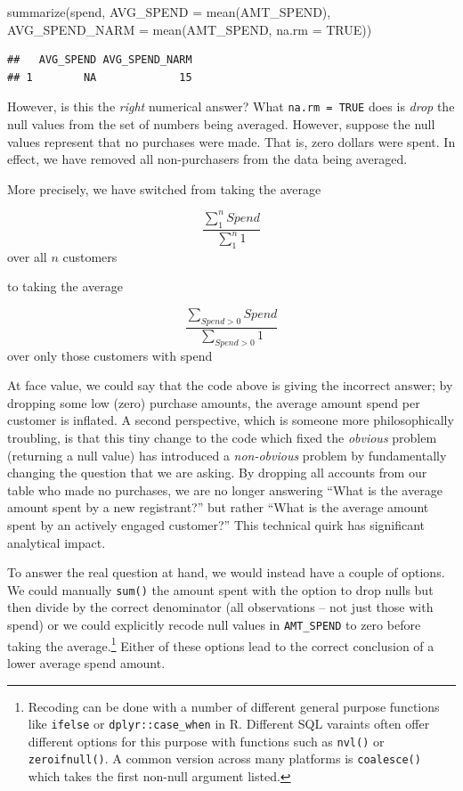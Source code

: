 \documentclass[
]{krantz}
\makeatletter
\newenvironment{Shaded}{\begin{snugshade}}{\end{snugshade}}
\newcommand{\AttributeTok}[1]{\textcolor[rgb]{0.61,0.61,0.61}{#1}}
\newcommand{\ConstantTok}[1]{\textcolor[rgb]{0,0,0}{#1}}
\newcommand{\FunctionTok}[1]{\textcolor[rgb]{0,0,0}{#1}}
\newcommand{\NormalTok}[1]{#1}
\newenvironment{kframe}{%
\medskip{}
\setlength{\fboxsep}{.8em}
 \def\at@end@of@kframe{}%
 \ifinner\ifhmode%
  \def\at@end@of@kframe{\end{minipage}}%
  \begin{minipage}{\columnwidth}%
 \fi\fi%
 \def\FrameCommand##1{\hskip\@totalleftmargin \hskip-\fboxsep
 \colorbox{shadecolor}{##1}\hskip-\fboxsep
     \hskip-\linewidth \hskip-\@totalleftmargin \hskip\columnwidth}%
 \MakeFramed {\advance\hsize-\width
   \@totalleftmargin\z@ \linewidth\hsize
   \@setminipage}}%
 {\par\unskip\endMakeFramed%
 \at@end@of@kframe}
\renewenvironment{Shaded}{\begin{kframe}}{\end{kframe}}
\makeatother
\begin{document}
\begin{Shaded}
\begin{Highlighting}[]
\FunctionTok{summarize}\NormalTok{(spend, }
          \AttributeTok{AVG\_SPEND =} \FunctionTok{mean}\NormalTok{(AMT\_SPEND),}
          \AttributeTok{AVG\_SPEND\_NARM =} \FunctionTok{mean}\NormalTok{(AMT\_SPEND, }\AttributeTok{na.rm =} \ConstantTok{TRUE}\NormalTok{))}
\end{Highlighting}
\end{Shaded}

\begin{verbatim}
##   AVG_SPEND AVG_SPEND_NARM
## 1        NA             15
\end{verbatim}

However, is this the \emph{right} numerical answer?
What \texttt{na.rm\ =\ TRUE} does is \emph{drop} the null values from the set of numbers being averaged.
However, suppose the null values represent that no purchases were made.
That is, zero dollars were spent.
In effect, we have removed all non-purchasers from the data being averaged.

More precisely, we have switched from taking the average

\[ \frac{ \sum_{1}^{n} Spend }{\sum_{1}^{n} 1} \] over all \(n\) customers

to taking the average

\[ \frac{ \sum_{Spend > 0} Spend }{\sum_{Spend > 0} 1} \] over only those customers with spend

At face value, we could say that the code above is giving the incorrect answer; by dropping some low (zero) purchase amounts, the average amount spend per customer is inflated.
A second perspective, which is someone more philosophically troubling, is that this tiny change to the code which fixed the \emph{obvious} problem (returning a null value) has introduced a \emph{non-obvious} problem by fundamentally changing the question that we are asking.
By dropping all accounts from our table who made no purchases, we are no longer answering ``What is the average amount spent by a new registrant?'' but rather ``What is the average amount spent by an actively engaged customer?''
This technical quirk has significant analytical impact.

To answer the real question at hand, we would instead have a couple of options.
We could manually \texttt{sum()} the amount spent with the option to drop nulls but then divide by the correct denominator (all observations -- not just those with spend) or we could explicitly recode null values in \texttt{AMT\_SPEND} to zero before taking the average.\footnote{Recoding can be done with a number of different general purpose functions like \texttt{ifelse} or \texttt{dplyr::case\_when} in R. Different SQL varaints often offer different options for this purpose with functions such as \texttt{nvl()} or \texttt{zeroifnull()}. A common version across many platforms is \texttt{coalesce()} which takes the first non-null argument listed.}
Either of these options lead to the correct conclusion of a lower average spend amount.
\end{document}
